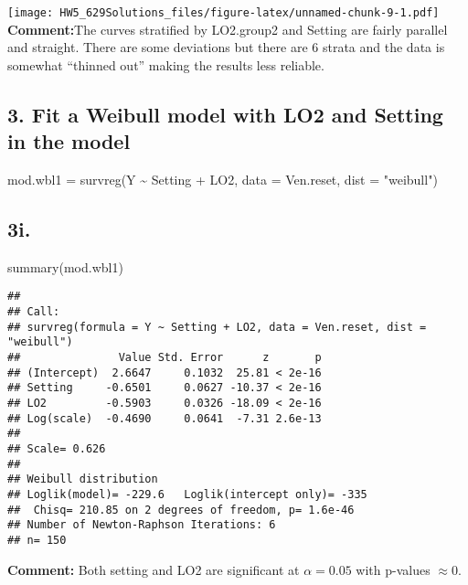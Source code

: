 \documentclass[
]{article}
\newenvironment{Shaded}{\begin{snugshade}}{\end{snugshade}}
\newcommand{\AttributeTok}[1]{\textcolor[rgb]{0.77,0.63,0.00}{#1}}
\newcommand{\FunctionTok}[1]{\textcolor[rgb]{0.00,0.00,0.00}{#1}}
\newcommand{\NormalTok}[1]{#1}
\newcommand{\OtherTok}[1]{\textcolor[rgb]{0.56,0.35,0.01}{#1}}
\newcommand{\SpecialCharTok}[1]{\textcolor[rgb]{0.00,0.00,0.00}{#1}}
\newcommand{\StringTok}[1]{\textcolor[rgb]{0.31,0.60,0.02}{#1}}
\begin{document}
\texttt{[image: HW5\_629Solutions\_files/figure-latex/unnamed-chunk-9-1.pdf]}
\textbf{Comment:}The curves stratified by LO2.group2 and Setting are
fairly parallel and straight. There are some deviations but there are 6
strata and the data is somewhat ``thinned out'' making the results less
reliable.

\hypertarget{fit-a-weibull-model-with-lo2-and-setting-in-the-model}{%
\subsection{3. Fit a Weibull model with LO2 and Setting in the
model}\label{fit-a-weibull-model-with-lo2-and-setting-in-the-model}}

\begin{Shaded}
\begin{Highlighting}[]
\NormalTok{mod.wbl1 }\OtherTok{=} \FunctionTok{survreg}\NormalTok{(Y }\SpecialCharTok{\textasciitilde{}}\NormalTok{ Setting }\SpecialCharTok{+}\NormalTok{ LO2, }\AttributeTok{data =}\NormalTok{ Ven.reset, }\AttributeTok{dist =} \StringTok{"weibull"}\NormalTok{)}
\end{Highlighting}
\end{Shaded}

\hypertarget{i.}{%
\subsection{3i.}\label{i.}}

\begin{Shaded}
\begin{Highlighting}[]
\FunctionTok{summary}\NormalTok{(mod.wbl1)}
\end{Highlighting}
\end{Shaded}

\begin{verbatim}
## 
## Call:
## survreg(formula = Y ~ Setting + LO2, data = Ven.reset, dist = "weibull")
##               Value Std. Error      z       p
## (Intercept)  2.6647     0.1032  25.81 < 2e-16
## Setting     -0.6501     0.0627 -10.37 < 2e-16
## LO2         -0.5903     0.0326 -18.09 < 2e-16
## Log(scale)  -0.4690     0.0641  -7.31 2.6e-13
## 
## Scale= 0.626 
## 
## Weibull distribution
## Loglik(model)= -229.6   Loglik(intercept only)= -335
##  Chisq= 210.85 on 2 degrees of freedom, p= 1.6e-46 
## Number of Newton-Raphson Iterations: 6 
## n= 150
\end{verbatim}

\textbf{Comment:} Both setting and LO2 are significant at
\(\alpha=0.05\) with p-values \(\approx0\).
\end{document}
